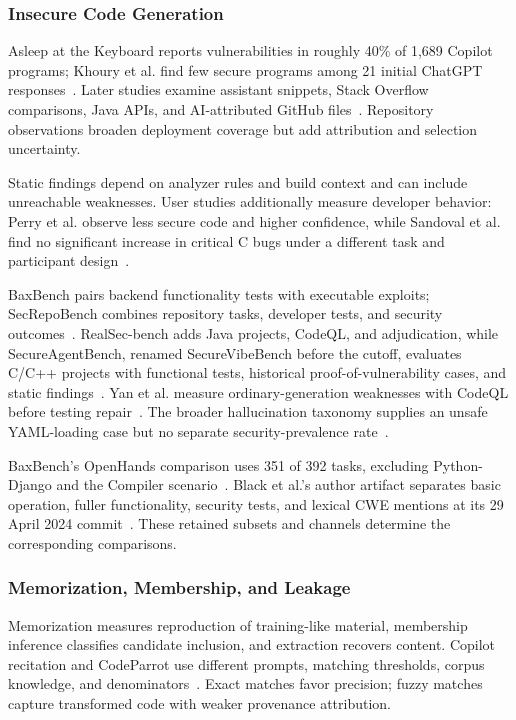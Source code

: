 \documentclass[acmsmall,screen,review,nonacm]{acmart}
\begin{document}
\subsubsection{Insecure Code Generation} \label{sec:gensec:insecure}
Asleep at the Keyboard reports vulnerabilities in roughly 40\% of 1,689 Copilot programs; Khoury et al. find few secure programs among 21 initial ChatGPT responses~\cite{pearce2022asleep,khoury2023secure}. Later studies examine assistant snippets, Stack Overflow comparisons, Java APIs, and AI-attributed GitHub files~\cite{fu2023security,hamer2024copy,mousavi2024investigation,largescale2025vulnerabilities}. Repository observations broaden deployment coverage but add attribution and selection uncertainty.

Static findings depend on analyzer rules and build context and can include unreachable weaknesses. User studies additionally measure developer behavior: Perry et al. observe less secure code and higher confidence, while Sandoval et al. find no significant increase in critical C bugs under a different task and participant design~\cite{perry2023users,sandoval2023lost}.

BaxBench pairs backend functionality tests with executable exploits; SecRepoBench combines repository tasks, developer tests, and security outcomes~\cite{baxbench2025,secrepobench2025}. RealSec-bench adds Java projects, CodeQL, and adjudication, while SecureAgentBench, renamed SecureVibeBench before the cutoff, evaluates C/C++ projects with functional tests, historical proof-of-vulnerability cases, and static findings~\cite{wang2026realsec,secureagentbench2025}. Yan et al. measure ordinary-generation weaknesses with CodeQL before testing repair~\cite{guiding2025fix}. The broader hallucination taxonomy supplies an unsafe YAML-loading case but no separate security-prevalence rate~\cite{zhang2024practicalhallucinations}.

BaxBench's OpenHands comparison uses 351 of 392 tasks, excluding Python-Django and the Compiler scenario~\cite{baxbench2025}. Black et al.'s author artifact separates basic operation, fuller functionality, security tests, and lexical CWE mentions at its 29 April 2024 commit~\cite{black2025balancing}. These retained subsets and channels determine the corresponding comparisons.

\subsubsection{Memorization, Membership, and Leakage} \label{sec:gensec:privacy}
Memorization measures reproduction of training-like material, membership inference classifies candidate inclusion, and extraction recovers content. Copilot recitation and CodeParrot use different prompts, matching thresholds, corpus knowledge, and denominators~\cite{ziegler2021recitation,yang2024unveiling}. Exact matches favor precision; fuzzy matches capture transformed code with weaker provenance attribution.
\end{document}
